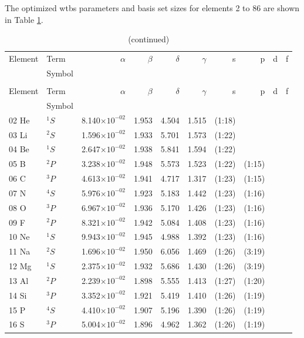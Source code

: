 \documentclass[12pt]{report}
\begin{document}
The optimized wtbs parameters and basis set sizes for elements 2 to 86 are shown in Table \ref{tab:BStab}.

\begin{longtable}{l l r r r r r r r r}
\caption{Basis sets optimized using rwtbs}\label{tab:BStab} \\
	Element	&	Term		&	$\alpha$	&	$\beta$	&	$\delta$	&	$\gamma$	&	s	&	p	&	d	&	f	\\
			&	Symbol	&			&			&			&				&		&		&		&		\\
\hline
\endfirsthead
\caption[]{(continued)}\\
	Element	&	Term		&	$\alpha$	&	$\beta$	&	$\delta$	&	$\gamma$	&	s	&	p	&	d	&	f	\\
			&	Symbol	&			&			&			&				&		&		&		&		\\
\hline
\endhead
02 He & $^{1}S$ & 8.140$\times10^{-02}$ & 1.953 & 4.504 & 1.515 & (1:18) \\
03 Li & $^{2}S$ & 1.596$\times10^{-02}$ & 1.933 & 5.701 & 1.573 & (1:22)  \\
04 Be & $^{1}S$ & 2.647$\times10^{-02}$ & 1.938 & 5.841 & 1.594 & (1:22) \\	
05 B & $^{2}P$ & 3.238$\times10^{-02}$ & 1.948 & 5.573 & 1.523 & (1:22) & (1:15) \\
06 C & $^{3}P$ & 4.613$\times10^{-02}$ & 1.941 & 4.717 & 1.317 & (1:23) & (1:15) \\
07 N & $^{4}S$ & 5.976$\times10^{-02}$ & 1.923 & 5.183 & 1.442 & (1:23) & (1:16)  \\
08 O & $^{3}P$ & 6.967$\times10^{-02}$ & 1.936 & 5.170 & 1.426 & (1:23) & (1:16) \\
09 F & $^{2}P$ & 8.321$\times10^{-02}$ & 1.942 & 5.084 & 1.408 & (1:23) & (1:16) \\
10 Ne & $^{1}S$ & 9.943$\times10^{-02}$ & 1.945 & 4.988 & 1.392 & (1:23) & (1:16) \\
11 Na & $^{2}S$ & 1.696$\times10^{-02}$ & 1.950 & 6.056 & 1.469 & (1:26) & (3:19)  \\
12 Mg & $^{1}S$ & 2.375$\times10^{-02}$ & 1.932 & 5.686 & 1.430 & (1:26) & (3:19) \\
13 Al & $^{2}P$ & 2.239$\times10^{-02}$ & 1.898 & 5.555 & 1.413 & (1:27) & (1:20)  \\
14 Si & $^{3}P$ & 3.352$\times10^{-02}$ & 1.921 & 5.419 & 1.410 & (1:26) & (1:19)  \\
15 P & $^{4}S$ & 4.410$\times10^{-02}$ & 1.907 & 5.196 & 1.390 & (1:26) & (1:19)     \\
16 S & $^{3}P$ & 5.004$\times10^{-02}$ & 1.896 & 4.962 & 1.362 & (1:26) & (1:19)     \\

\end{longtable}
\end{document}
